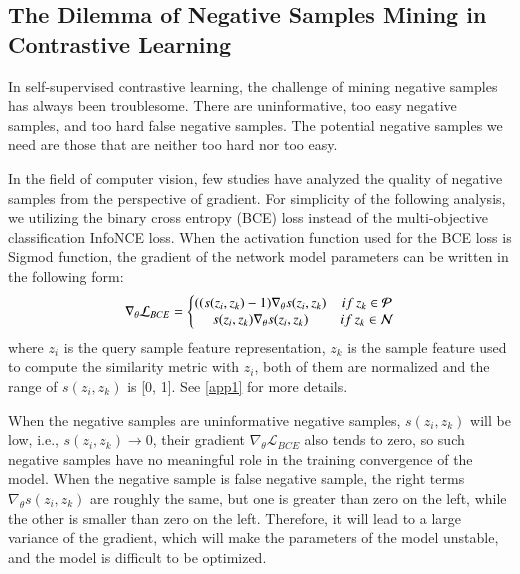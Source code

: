 \documentclass[review]{elsarticle}
\begin{document}
\subsection{The Dilemma of Negative Samples Mining in Contrastive Learning}
\label{chap3.2}
In self-supervised contrastive learning, the challenge of mining negative samples has always been troublesome. There are uninformative, too easy negative samples, and too hard false negative samples. The potential negative samples we need are those that are neither too hard nor too easy.

In the field of computer vision, few studies have analyzed the quality of negative samples from the perspective of gradient. For simplicity of the following analysis, we utilizing the binary cross entropy (BCE) loss instead of the multi-objective classification InfoNCE loss. When the activation function used for the BCE loss is Sigmod function, the gradient of the network model parameters can be written in the following form: 
\begin{equation}
\begin{aligned}
\nabla_{\theta}\mathcal{L} _{BCE}= 
\left\{\begin{matrix}
( (s( z_i,z_k)-1)\nabla_{\theta}s(z_i,z_k)  & if \thinspace  z_k\in  \mathcal{P} 
 \\ 
s( z_i,z_k)\nabla_{\theta}s( z_i,z_k)  &if \thinspace   z_k\in  \mathcal{N}  
\end{matrix}\right.
\label{equation2}
\end{aligned}
\end{equation}
where $z_i$ is the query sample feature representation, $z_k$ is the sample feature used to compute the similarity metric with $z_i$, both of them are normalized and the range of  $s(z_i,z_k)$ is [0, 1]. See \ref{app1} for more details.

When the negative samples are uninformative negative samples, $s(z_i,z_k)$ will be low, i.e., $s(z_i,z_k)\rightarrow 0$, their gradient $\nabla_{\theta}\mathcal{L} _{BCE}$ also tends to zero, so such negative samples have no meaningful role in the training convergence of the model. When the negative sample is false negative sample, the right terms $\nabla_{\theta}s( z_i,z_k)$ are roughly the same, but one is greater than zero on the left, while the other is smaller than zero on the left. Therefore, it will lead to a large variance of the gradient, which will make the parameters of the model unstable, and the model is difficult to be optimized. 
\end{document}
